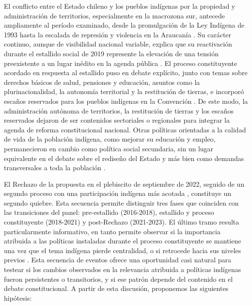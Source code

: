 \documentclass{article}
\begin{document}
El conflicto entre el Estado chileno y los pueblos indígenas por la propiedad y administración de territorios, especialmente en la macrozona sur, antecede ampliamente al período examinado, desde la promulgación de la Ley Indígena de 1993 hasta la escalada de represión y violencia en la Araucanía \parencite{montenegro2024,pairican2021}. Su carácter continuo, aunque de visibilidad nacional variable, explica que su reactivación durante el estallido social de 2019 represente la elevación de una tensión preexistente a un lugar inédito en la agenda pública \parencite{piscopo2021,somma2021}. El proceso constituyente acordado en respuesta al estallido puso en debate explícito, junto con temas sobre derechos básicos de salud, pensiones y educación, asuntos como la plurinacionalidad, la autonomía territorial y la restitución de tierras, e incorporó escaños reservados para los pueblos indígenas en la Convención \parencite{bauer2018,disipavlic2024,herraz2026,turrachico2026}. De este modo, la administración autónoma de territorios, la restitución de tierras y los escaños reservados dejaron de ser contenidos sectoriales o regionales para integrar la agenda de reforma constitucional nacional. Otras políticas orientadas a la calidad de vida de la población indígena, como mejorar su educación y empleo, permanecieron en cambio como política social secundaria, sin un lugar equivalente en el debate sobre el rediseño del Estado \parencite{suarezdelucchi2024} y más bien como demandas transversales a toda la población \parencite{somma2021}.

El Rechazo de la propuesta en el plebiscito de septiembre de 2022, seguido de un segundo proceso con una participación indígena más acotada \parencite{turrachico2026}, constituye un segundo quiebre. Esta secuencia permite distinguir tres fases que coinciden con las transiciones del panel: pre-estallido (2016-2018), estallido y proceso constituyente (2018-2021) y post-Rechazo (2021-2023). El último tramo resulta particularmente informativo, en tanto permite observar si la importancia atribuida a las políticas instaladas durante el proceso constituyente se mantiene una vez que el tema indígena pierde centralidad, o si retrocede hacia sus niveles previos \parencite{kiley2020}. Esta secuencia de eventos ofrece una oportunidad casi natural para testear si los cambios observados en la relevancia atribuida a políticas indígenas fueron persistentes o transitorios, y si ese patrón depende del contenido en el debate constitucional. A partir de esta discusión, proponemos las siguientes hipótesis:
\end{document}
